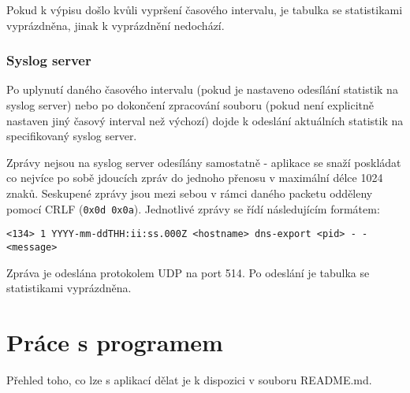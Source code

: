 \documentclass[11pt]{article}
\begin{document}
	Pokud k výpisu došlo kvůli vypršení časového intervalu, je tabulka se statistikami vyprázdněna, jinak k vyprázdnění nedochází.
	
	\subsubsection{Syslog server}
	Po uplynutí daného časového intervalu (pokud je nastaveno odesílání statistik na syslog server) nebo po dokončení zpracování souboru (pokud není explicitně nastaven jiný časový interval než výchozí) dojde k odeslání aktuálních statistik na specifikovaný syslog server.
	
	Zprávy nejsou na syslog server odesílány samostatně - aplikace se snaží poskládat co nejvíce po sobě jdoucích zpráv do jednoho přenosu v maximální délce 1024 znaků. Seskupené zprávy jsou mezi sebou v rámci daného packetu odděleny pomocí CRLF (\texttt{0x0d 0x0a}). Jednotlivé zprávy se řídí následujícím formátem:
	\begin{verbatim}
<134> 1 YYYY-mm-ddTHH:ii:ss.000Z <hostname> dns-export <pid> - - <message>
	\end{verbatim}
	
	Zpráva je odeslána protokolem UDP na port 514\cite{RFC5424}. Po odeslání je tabulka se statistikami vyprázdněna.
	
	
	\section{Práce s programem}
	Přehled toho, co lze s aplikací dělat je k dispozici v souboru \textsf{README.md}.
	
	\newpage
	
	
	
\end{document}
